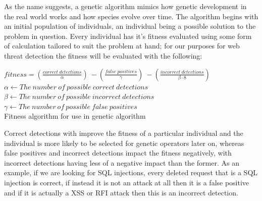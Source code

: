 As the name suggests, a genetic algorithm mimics how genetic development in the real world works and how species evolve over time.  The algorithm begins with an initial population of individuals, an individual being a possible solution to the problem in question.  Every individual has it's fitness evaluated using some form of calculation tailored to suit the problem at hand; for our purposes for web threat detection the fitness will be evaluated with the following:

\begin{algorithm}[H]
	\centering

	$fitness = (\frac{correct\ detections}{\alpha})\ - (\frac{false\ positives}{\gamma})\ - (\frac{incorrect\ detections}{\beta \cdot 8})$ \\

	$\alpha \leftarrow The\ number\ of\ possible\ correct\ detections$ \\
	$\beta \leftarrow The\ number\ of\ possible\ incorrect\ detections$ \\
	$\gamma \leftarrow The\ number\ of\ possible\ false\ positives$ \\

	\caption{Fitness algorithm for use in genetic algorithm}
	\label{alg:fitness}
	\vspace{2cm}
\end{algorithm}

Correct detections with improve the fitness of a particular individual and the individual is more likely to be selected for genetic operators later on, whereas false positives and incorrect detections impact the fitness negatively, with incorrect detections having less of a negative impact than the former.  As an example, if we are looking for SQL injections, every deleted request that is a SQL injection is correct, if instead it is not an attack at all then it is a false positive and if it is actually a XSS or RFI attack then this is an incorrect detection.

